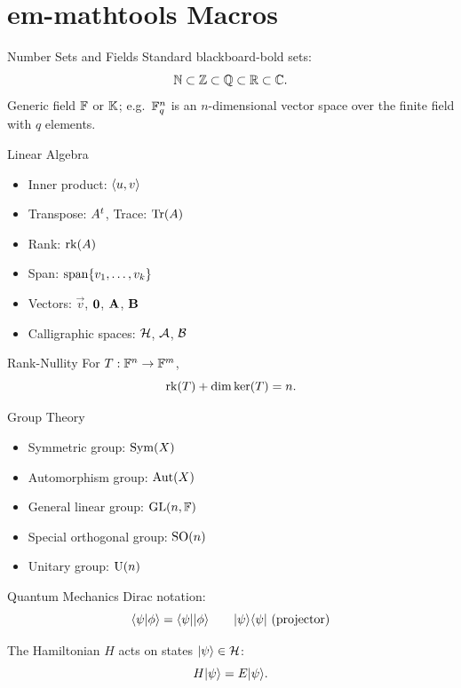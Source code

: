 \documentclass{beamer}
\begin{document}
\section{em-mathtools Macros}

\begin{frame}{Number Sets and Fields}
    Standard blackboard-bold sets:
    \[
        \mathbb{N} \subset \mathbb{Z} \subset \mathbb{Q} \subset \mathbb{R} \subset \mathbb{C}.
    \]
    Generic field $\mathbb{F}$ or $\mathbb{K}$; e.g.\ $\mathbb{F}_{q}^{n}$ is an $n$-dimensional
    vector space over the finite field with $q$ elements.
\end{frame}

\begin{frame}{Linear Algebra}
    \begin{itemize}
        \item Inner product: $\langle{u}, {v}\rangle$
        \item Transpose: ${A}^{t}$, \quad Trace: $\mathrm{Tr}(A)$
        \item Rank: $\mathrm{rk}(A)$
        \item Span: $\mathrm{span}\{v_{1}, \ldots, v_{k}\}$
        \item Vectors: $\vec{v}$, $\mathbf{0}$, $\mathbf{A}$, $\mathbf{B}$
        \item Calligraphic spaces: $\mathcal{H}$, $\mathcal{A}$, $\mathcal{B}$
    \end{itemize}

    \pause

    \begin{block}{Rank-Nullity}
        For $T : \mathbb{F}^{n} \to \mathbb{F}^{m}$,
        \[
            \mathrm{rk}(T) + \dim\ker(T) = n.
        \]
    \end{block}
\end{frame}

\begin{frame}{Group Theory}
    \begin{itemize}
        \item Symmetric group: $\mathrm{Sym}(X)$
        \item Automorphism group: $\mathrm{Aut}(X)$
        \item General linear group: $\mathrm{GL}(n, \mathbb{F})$
        \item Special orthogonal group: $\mathrm{SO}(n)$
        \item Unitary group: $\mathrm{U}(n)$
    \end{itemize}
\end{frame}

\begin{frame}{Quantum Mechanics}
    Dirac notation:
    \[
        \langle{\psi}|{\phi}\rangle = \langle{\psi}||{\phi}\rangle
        \qquad
        |{\psi}\rangle\langle{\psi}| \text{ (projector)}
    \]

    The Hamiltonian $H$ acts on states $|{\psi}\rangle \in \mathcal{H}$:
    \[
        H|{\psi}\rangle = E|{\psi}\rangle.
    \]
\end{frame}
\end{document}
